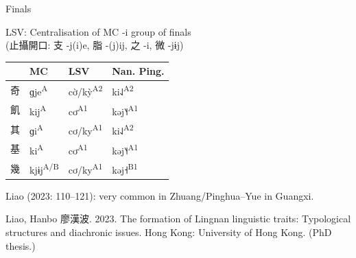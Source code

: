 \documentclass{beamer}
\begin{document}
\begin{frame}[fragile]{Finals}

LSV: Centralisation of MC -i group of finals\\ (止攝開口: 支 -j(i)e, 脂 -(j)ij, 之 -i, 微 -jɨj)\\ 

\bigskip
\begin{tabular}{l l|l l}
 & MC & LSV & Nan. Ping.\\ \hline
奇 & ɡje\textsuperscript{A} & cờ/kỳ\textsuperscript{A2} & ki˨˩\textsuperscript{A2}\\ 
飢 & kij\textsuperscript{A} & cơ\textsuperscript{A1} & kəj˥˧\textsuperscript{A1}\\
其 & ɡi\textsuperscript{A} & cơ/ky\textsuperscript{A1} & ki˨˩\textsuperscript{A2}\\
基 & ki\textsuperscript{A} & cơ\textsuperscript{A1} & kəj˥˧\textsuperscript{A1}\\
幾 & kjɨj\textsuperscript{A/B} & cơ/ky\textsuperscript{A1} & kəj˧\textsuperscript{B1}\\
\end{tabular}

\bigskip
Liao (2023: 110–121): very common in Zhuang/Pinghua–Yue in Guangxi.

\vfill {} {\tiny Liao, Hanbo 廖漢波. 2023. The formation of Lingnan linguistic traits: Typological structures and diachronic issues. Hong Kong: University of Hong Kong. (PhD thesis.)}\par 

\end{frame}
\end{document}
